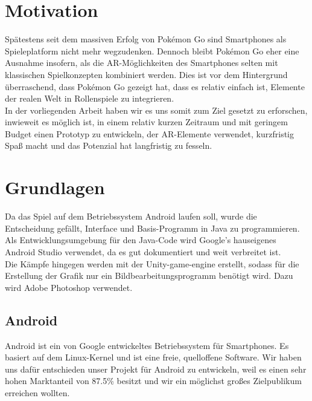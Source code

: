 \documentclass[extern,palatino]{cgBA}
\begin{document}
	\section{Motivation}
	Spätestens seit dem massiven Erfolg von Pokémon Go sind Smartphones als Spieleplatform nicht mehr wegzudenken. Dennoch bleibt Pokémon Go eher eine Ausnahme insofern, als die AR-Möglichkeiten des Smartphones selten mit klassischen Spielkonzepten kombiniert werden. Dies ist vor dem Hintergrund überraschend, dass Pokémon Go gezeigt hat, dass es relativ einfach ist, Elemente der realen Welt in Rollenspiele zu integrieren. \\In der vorliegenden Arbeit haben wir es uns somit zum Ziel gesetzt zu erforschen, inwieweit es möglich ist, in einem relativ kurzen Zeitraum und mit geringem Budget einen Prototyp zu entwickeln, der AR-Elemente verwendet, kurzfristig Spaß macht und das Potenzial hat langfristig zu fesseln.
	\newpage
	\section{Grundlagen}
	Da das Spiel auf dem Betriebssystem Android laufen soll, wurde die Entscheidung gefällt, Interface und Basis-Programm in Java zu programmieren. Als Entwicklungsumgebung für den Java-Code wird Google's hauseigenes Android Studio verwendet, da es gut dokumentiert und weit verbreitet ist.
	\\Die Kämpfe hingegen werden mit der Unity-game-engine erstellt, sodass für die Erstellung der Grafik nur ein Bildbearbeitungsprogramm benötigt wird. Dazu wird Adobe Photoshop verwendet.
	\subsection{Android}
	Android ist ein von Google entwickeltes Betriebssystem für Smartphones. Es basiert auf dem Linux-Kernel und ist eine freie, quelloffene Software. Wir haben uns dafür entschieden unser Projekt für Android zu entwickeln, weil es einen sehr hohen Marktanteil von 87.5\% besitzt und wir ein möglichst großes Zielpublikum erreichen wollten. 
\end{document}
